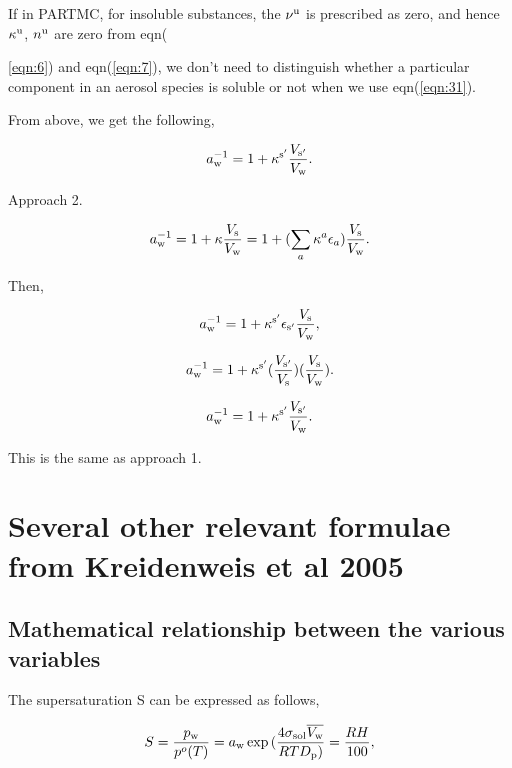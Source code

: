 \documentclass[12pt]{article}
\begin{document}
If in PARTMC, for insoluble substances, the $\nu^{\rm u}$ is prescribed as zero, and hence $\kappa^{\rm u}$, $n^{\rm u}$  are zero from eqn({\ref{eqn:6}) and eqn(\ref{eqn:7}), we don't need to distinguish whether a particular component in an aerosol species is soluble or not when we use eqn(\ref{eqn:31}).

From above, we get the following,

\begin{equation}\label{eqn:37}
a_{\rm w}^{-1}=1+ \kappa^{\rm s'} \frac{V_{\rm s'}}{V_{\rm w}}.
\end{equation}

Approach 2.

\begin{equation}\label{eqn:38}
a_{\rm w}^{-1}=1+\kappa \frac{V_{\rm s}}{V_{\rm w}}=1+ (\sum_{a} \kappa^{a} \epsilon_{a})\frac{V_{\rm s}}{V_{\rm w}}.
\end{equation}

Then,

\begin{equation}\label{eqn:39}
a_{\rm w}^{-1}=1+ \kappa^{\rm s'} \epsilon_{\rm s'} \frac{V_{\rm s}}{V_{\rm w}},
\end{equation}

\begin{equation}\label{eqn:40}
a_{\rm w}^{-1}=1+ \kappa^{\rm s'} (\frac{V_{\rm s'}}{V_{\rm s}})(\frac{V_{\rm s}}{V_{\rm w}}).
\end{equation}

\begin{equation}\label{eqn:37}
a_{\rm w}^{-1}=1+ \kappa^{\rm s'} \frac{V_{\rm s'}}{V_{\rm w}}.
\end{equation}

This is the same as approach 1. 


\section{Several other relevant formulae from Kreidenweis et al 2005}

\subsection{Mathematical relationship between the various variables}

The supersaturation S can be expressed as follows,

\begin{equation}
S=\frac{p_{\rm w}}{p^{o}(T)}=a_{\rm w} \exp {(\frac{4 \sigma_{\rm sol} \overline{V_{\rm w}}} {RT D_{\rm p} ) } }= \frac {RH}{100},
\end{equation}

}
\end{document}
